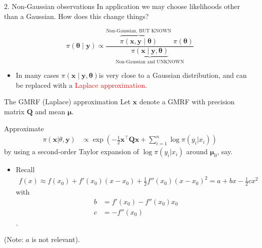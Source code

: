 \documentclass[
  ignorenonframetext,
]{beamer}
\providecommand{\tightlist}{%
  \setlength{\itemsep}{0pt}\setlength{\parskip}{0pt}}
\begin{document}
\begin{frame}{2. Non-Gaussian observations}
\protect\hypertarget{non-gaussian-observations}{}
In application we may choose likelihoods other than a Gaussian. How does
this change things?

\[
\pi(\mathbf{\theta} \mid \mathbf{y}) \propto \frac{
            \overbrace{\pi(\mathbf{x}, \mathbf{y}\mid \mathbf{\theta})}^{\text{Non-Gaussian, BUT KNOWN}}
        \; \pi(\mathbf{\theta})}{\underbrace{\pi(\mathbf{x} \mid \mathbf{y},
            \mathbf{\theta})}_{\text{Non-Gaussian and UNKNOWN}}}
\]

\begin{itemize}
\tightlist
\item
  In many cases
  \(\pi(\boldsymbol{x} \mid \boldsymbol{y}, \boldsymbol{\theta})\)is
  very close to a Gaussian distribution, and can be replaced with a
  \textcolor{red}{Laplace approximation}.
\end{itemize}
\end{frame}

\begin{frame}{The GMRF (Laplace) approximation}
\protect\hypertarget{the-gmrf-laplace-approximation}{}
Let \(\mathbf{x}\) denote a GMRF with precision matrix \(\mathbf{Q}\)
and mean \(\mathbf{\mu}\).

Approximate \[
\begin{aligned}
\pi(\mathbf{x}|\theta,\mathbf{y}) &\propto
            \exp\left(-\frac{1}{2}\mathbf{x}^\top \mathbf{Q}\mathbf{x} + \sum_{i=1}^n \log \pi (y_i|x_i)\right)
\end{aligned}
\] by using a second-order Taylor expansion of \(\log \pi (y_i|x_i)\)
around \(\mathbf{\mu}_0\), say.

\begin{itemize}
\tightlist
\item
  Recall \[
  \begin{aligned}
        f(x) \approx f(x_0) + f'(x_0)(x-x_0)+ \frac{1}{2} f''(x_0)(x-x_0)^2
        = a+ bx - \frac{1}{2}cx^2
  \end{aligned}
  \] with \[
  \begin{aligned}
  b &=f'(x_0) - f''(x_0)x_0\\
  c &= -f''(x_0)
  \end{aligned}
  \].
\end{itemize}

(Note: \(a\) is not relevant).
\end{frame}
\end{document}
